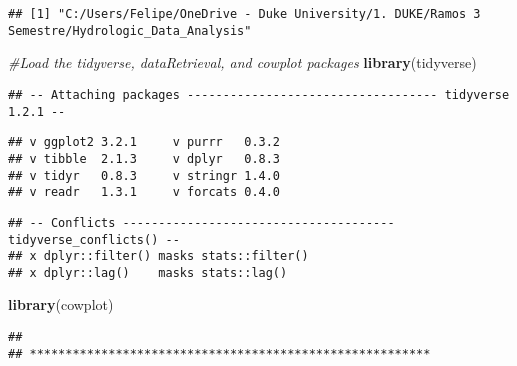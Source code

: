\documentclass[]{article}
\newenvironment{Shaded}{\begin{snugshade}}{\end{snugshade}}
\newcommand{\CommentTok}[1]{\textcolor[rgb]{0.56,0.35,0.01}{\textit{#1}}}
\newcommand{\DataTypeTok}[1]{\textcolor[rgb]{0.13,0.29,0.53}{#1}}
\newcommand{\KeywordTok}[1]{\textcolor[rgb]{0.13,0.29,0.53}{\textbf{#1}}}
\newcommand{\NormalTok}[1]{#1}
\newcommand{\OperatorTok}[1]{\textcolor[rgb]{0.81,0.36,0.00}{\textbf{#1}}}
\newcommand{\OtherTok}[1]{\textcolor[rgb]{0.56,0.35,0.01}{#1}}
\begin{document}
\begin{Shaded}
\end{Shaded}

\begin{verbatim}
## [1] "C:/Users/Felipe/OneDrive - Duke University/1. DUKE/Ramos 3 Semestre/Hydrologic_Data_Analysis"
\end{verbatim}

\begin{Shaded}
\begin{Highlighting}[]
\CommentTok{#Load the tidyverse, dataRetrieval, and cowplot packages}
\KeywordTok{library}\NormalTok{(tidyverse)}
\end{Highlighting}
\end{Shaded}

\begin{verbatim}
## -- Attaching packages ----------------------------------- tidyverse 1.2.1 --
\end{verbatim}

\begin{verbatim}
## v ggplot2 3.2.1     v purrr   0.3.2
## v tibble  2.1.3     v dplyr   0.8.3
## v tidyr   0.8.3     v stringr 1.4.0
## v readr   1.3.1     v forcats 0.4.0
\end{verbatim}

\begin{verbatim}
## -- Conflicts -------------------------------------- tidyverse_conflicts() --
## x dplyr::filter() masks stats::filter()
## x dplyr::lag()    masks stats::lag()
\end{verbatim}

\begin{Shaded}
\begin{Highlighting}[]
\KeywordTok{library}\NormalTok{(cowplot)}
\end{Highlighting}
\end{Shaded}

\begin{verbatim}
## 
## ********************************************************
\end{verbatim}
\end{document}
